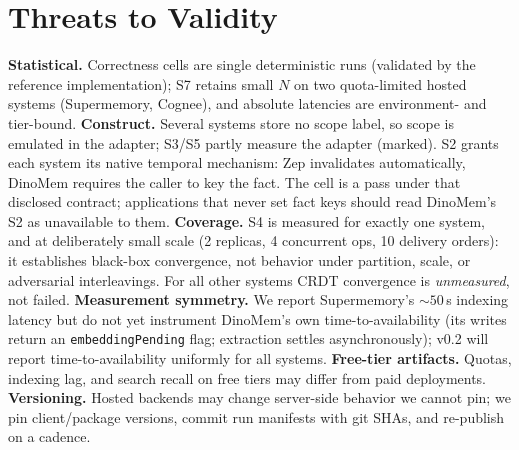 \documentclass[11pt]{article}
\begin{document}
\section{Threats to Validity}\label{sec:threats}
\textbf{Statistical.} Correctness cells are single deterministic runs (validated by
the reference implementation); S7 retains small $N$ on two quota-limited hosted
systems (Supermemory, Cognee), and absolute latencies are environment- and
tier-bound. \textbf{Construct.} Several systems store no scope label, so scope is
emulated in the adapter; S3/S5 partly measure the adapter (marked). S2 grants each
system its native temporal mechanism: Zep invalidates automatically, DinoMem
requires the caller to key the fact. The cell is a pass under that disclosed
contract; applications that never set fact keys should read DinoMem's S2 as
unavailable to them. \textbf{Coverage.} S4 is measured for exactly one system, and
at deliberately small scale (2 replicas, 4 concurrent ops, 10 delivery orders): it
establishes black-box convergence, not behavior under partition, scale, or
adversarial interleavings. For all other systems CRDT convergence is
\emph{unmeasured}, not failed. \textbf{Measurement symmetry.} We report Supermemory's ${\sim}50$\,s indexing
latency but do not yet instrument DinoMem's own time-to-availability (its writes
return an \texttt{embeddingPending} flag; extraction settles asynchronously); v0.2
will report time-to-availability uniformly for all systems.
\textbf{Free-tier artifacts.} Quotas, indexing lag,
and search recall on free tiers may differ from paid deployments.
\textbf{Versioning.} Hosted backends may change server-side behavior we cannot pin;
we pin client/package versions, commit run manifests with git SHAs, and re-publish
on a cadence.
\end{document}
